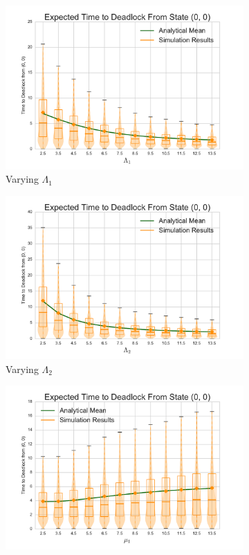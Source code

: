 \documentclass{article}
\begin{document}
\begin{figure}[H]
\begin{subfigure}[b]{0.5\textwidth}
  \includegraphics[width=\textwidth]{images/vary_L1fb}
  \caption{Varying $\Lambda_1$}
  \label{fig:timestodeadlockfb_L1}
\end{subfigure}
\begin{subfigure}[b]{0.5\textwidth}
  \includegraphics[width=\textwidth]{images/vary_L2fb}
  \caption{Varying $\Lambda_2$}
  \label{fig:timestodeadlockfb_L2}
\end{subfigure}
\begin{subfigure}[b]{0.5\textwidth}
  \includegraphics[width=\textwidth]{images/vary_mu1fb}

\end{subfigure}
\end{figure}
\end{document}
